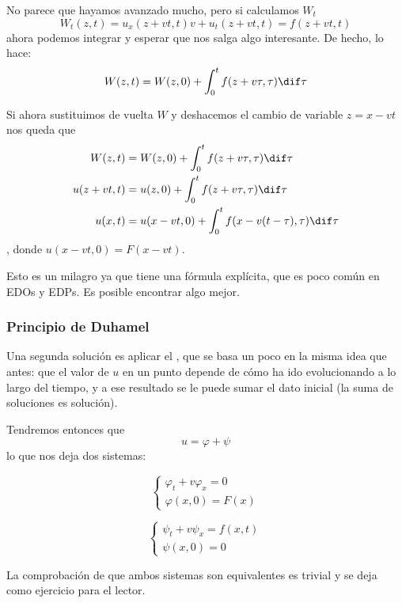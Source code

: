 			No parece que hayamos avanzado mucho, pero si calculamos $W_t$ \[
				W_t(z,t) = u_x(z + vt, t)v + u_t(z+vt, t) = f(z + vt, t)
			\] ahora podemos integrar y esperar que nos salga algo interesante. De hecho, lo hace:
			\[ W(z,t) = W(z,0) + \int^{t}_{0} f(z+v\tau, \tau)\dif\tau \]

			Si ahora sustituimos de vuelta $W$ y deshacemos el cambio de variable $z = x -vt$ nos queda que \begin{align}
			W(z,t) &= W(z,0) + \int^{t}_{0} f(z+v\tau, \tau)\dif\tau \nonumber \\
			u(z + vt, t) &= u(z,0) + \int^{t}_{0} f(z+v\tau, \tau) \dif \tau \nonumber \\
			u(x,t) &= u(x-vt,0)+ \int^{t}_{0} f(x-v(t-\tau),\tau) \dif \tau \label{eq:ModeloCombinado}
			\end{align}, donde $u(x-vt,0) = F(x-vt)$.

			Esto es un milagro ya que tiene una fórmula explícita, que es poco común en EDOs y EDPs. Es posible encontrar algo mejor.

		\subsubsection{Principio de Duhamel}
		\label{sec:PrincipioDuhamel}

			Una segunda solución es aplicar el , que se basa un poco en la misma idea que antes: que el valor de $u$ en un punto depende de cómo ha ido evolucionando a lo largo del tiempo, y a ese resultado se le puede sumar el dato inicial (la suma de soluciones es solución).

			Tendremos entonces que \[ u = \varphi + \psi \] lo que nos deja dos sistemas:

			\begin{minipage}{.5\linewidth}
				\[
				\begin{cases*}
					\varphi_t + v\varphi_x = 0\\
					\varphi(x,0) = F(x)
				\end{cases*}
				\]
			\end{minipage}
			\begin{minipage}{.5\linewidth}
				\[
				\begin{cases*}
					\psi_t + v\psi_x = f(x,t) \\
					\psi(x,0) = 0
				\end{cases*}
				\]
			\end{minipage}

			La comprobación de que ambos sistemas son equivalentes es trivial y se deja como ejercicio para el lector.

